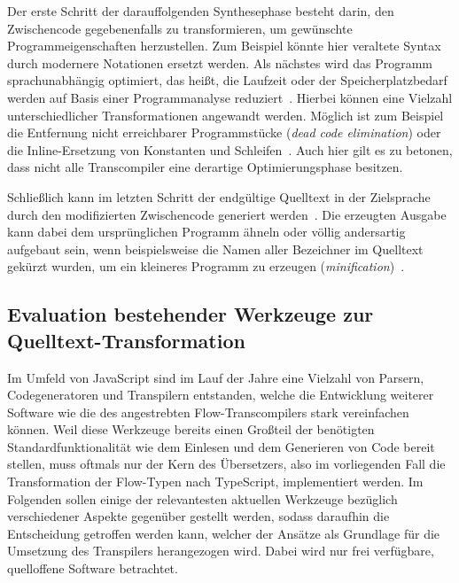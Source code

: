Der erste Schritt der darauffolgenden Synthesephase besteht darin, den Zwischencode gegebenenfalls zu transformieren, um gewünschte Programmeigenschaften herzustellen. Zum Beispiel könnte hier veraltete Syntax durch modernere Notationen ersetzt werden. Als nächstes wird das Programm sprachunabhängig optimiert, das heißt, die Laufzeit oder der Speicherplatzbedarf werden auf Basis einer Programmanalyse reduziert~\autocite[405]{TORCZON:2007}. Hierbei können eine Vielzahl unterschiedlicher Transformationen angewandt werden. Möglich ist zum Beispiel die Entfernung nicht erreichbarer Programmstücke (\textit{dead code elimination}) oder die Inline-Ersetzung von Konstanten und Schleifen~\autocites{TORCZON:2007}{SCHOEPP:COMPILER}. Auch hier gilt es zu betonen, dass nicht alle Transcompiler eine derartige Optimierungsphase besitzen.

Schließlich kann im letzten Schritt der endgültige Quelltext in der Zielsprache durch den modifizierten Zwischencode generiert werden~\autocite[505]{AHO:COMPILERS}. Die erzeugten Ausgabe kann dabei dem ursprünglichen Programm ähneln oder völlig andersartig aufgebaut sein, wenn beispielsweise die Namen aller Bezeichner im Quelltext gekürzt wurden, um ein kleineres Programm zu erzeugen (\textit{minification})~\autocite{FOWLER:TRANSPARENT}.

\subsection{Evaluation bestehender Werkzeuge zur Quelltext-Transformation}
\label{sec:js-transpilers}

Im Umfeld von JavaScript sind im Lauf der Jahre eine Vielzahl von Parsern, Codegeneratoren und Transpilern entstanden, welche die Entwicklung weiterer Software wie die des angestrebten Flow-Transcompilers stark vereinfachen können. Weil diese Werkzeuge bereits einen Großteil der benötigten Standardfunktionalität wie dem Einlesen und dem Generieren von Code bereit stellen, muss oftmals nur der Kern des Übersetzers, also im vorliegenden Fall die Transformation der Flow-Typen nach TypeScript, implementiert werden. Im Folgenden sollen einige der relevantesten aktuellen Werkzeuge bezüglich verschiedener Aspekte gegenüber gestellt werden, sodass daraufhin die Entscheidung getroffen werden kann, welcher der Ansätze als Grundlage für die Umsetzung des Transpilers herangezogen wird. Dabei wird nur frei verfügbare, quelloffene Software betrachtet.

